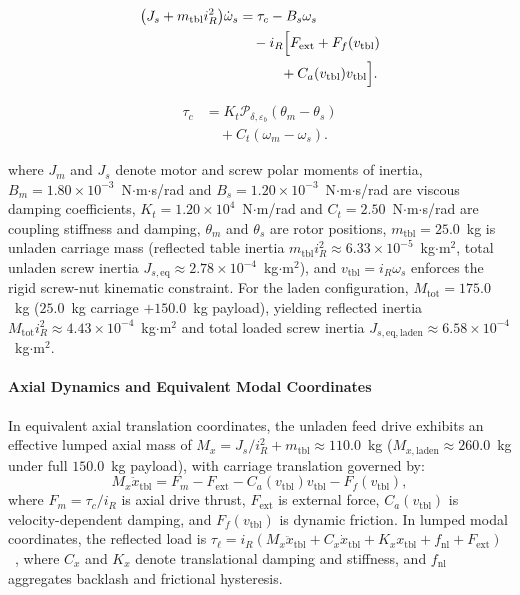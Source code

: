 \documentclass[a4paper,fleqn]{cas-dc}
\begin{document}
\begin{equation}
\label{eq:tor_screw}
\begin{aligned}
\bigl(J_s+m_{\mathrm{tbl}}i_R^2\bigr)
\dot{\omega}_s
&= \tau_c-B_s\omega_s\\
&\quad-i_R\Bigl[
F_{\mathrm{ext}}+F_f(v_{\mathrm{tbl}})\\
&\qquad\quad
+C_a(v_{\mathrm{tbl}})v_{\mathrm{tbl}}
\Bigr].
\end{aligned}
\end{equation}

\begin{equation}
\label{eq:tor_couple}
\begin{aligned}
\tau_c
&= K_t\mathcal{P}_{\delta,\varepsilon_b}
(\theta_m-\theta_s)\\
&\quad+C_t(\omega_m-\omega_s).
\end{aligned}
\end{equation}

where $J_m$ and $J_s$ denote motor and screw polar moments of inertia, $B_m = 1.80 \times 10^{-3}$~N$\cdot$m$\cdot$s/rad and $B_s = 1.20 \times 10^{-3}$~N$\cdot$m$\cdot$s/rad are viscous damping coefficients, $K_t = 1.20 \times 10^4$~N$\cdot$m/rad and $C_t = 2.50$~N$\cdot$m$\cdot$s/rad are coupling stiffness and damping, $\theta_m$ and $\theta_s$ are rotor positions, $m_{\mathrm{tbl}} = 25.0$~kg is unladen carriage mass (reflected table inertia $m_{\mathrm{tbl}} i_R^2 \approx 6.33 \times 10^{-5}$~kg$\cdot$m$^2$, total unladen screw inertia $J_{s,\mathrm{eq}} \approx 2.78 \times 10^{-4}$~kg$\cdot$m$^2$), and $v_{\mathrm{tbl}} = i_R \omega_s$ enforces the rigid screw-nut kinematic constraint. For the laden configuration, $M_{\mathrm{tot}} = 175.0$~kg ($25.0$~kg carriage $+ 150.0$~kg payload), yielding reflected inertia $M_{\mathrm{tot}} i_R^2 \approx 4.43 \times 10^{-4}$~kg$\cdot$m$^2$ and total loaded screw inertia $J_{s,\mathrm{eq},\mathrm{laden}} \approx 6.58 \times 10^{-4}$~kg$\cdot$m$^2$.

\paragraph{Axial Dynamics and Equivalent Modal Coordinates}
In equivalent axial translation coordinates, the unladen feed drive exhibits an effective lumped axial mass of $M_x = J_s / i_R^2 + m_{\mathrm{tbl}} \approx 110.0$~kg ($M_{x,\mathrm{laden}} \approx 260.0$~kg under full $150.0$~kg payload), with carriage translation governed by:
\begin{equation}
    M_x \ddot{x}_{\mathrm{tbl}} = F_m - F_{\mathrm{ext}} - C_a(v_{\mathrm{tbl}}) v_{\mathrm{tbl}} - F_f(v_{\mathrm{tbl}}),
    \label{eq:axial_dynamics}
\end{equation}
where $F_m = \tau_c / i_R$ is axial drive thrust, $F_{\mathrm{ext}}$ is external force, $C_a(v_{\mathrm{tbl}})$ is velocity-dependent damping, and $F_f(v_{\mathrm{tbl}})$ is dynamic friction. In lumped modal coordinates, the reflected load is $\tau_\ell = i_R (M_x \ddot{x}_{\mathrm{tbl}} + C_x \dot{x}_{\mathrm{tbl}} + K_x x_{\mathrm{tbl}} + f_{\mathrm{nl}} + F_{\mathrm{ext}})$~\cite{PriorWork_MSSP_2026}, where $C_x$ and $K_x$ denote translational damping and stiffness, and $f_{\mathrm{nl}}$ aggregates backlash and frictional hysteresis.
\end{document}
